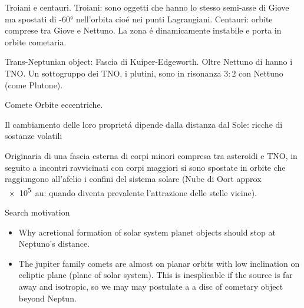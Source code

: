 \begin{frame}{Troiani e centauri.}
Troiani: sono oggetti che hanno lo stesso semi-asse di Giove ma spostati di \ang{+-60} nell'orbita cio\'e nei punti Lagrangiani.
Centauri: orbite comprese tra Giove e Nettuno. La zona \'e dinamicamente instabile e porta in orbite cometaria.
\end{frame}

\begin{frame}{Trans-Neptunian object: Fascia di Kuiper-Edgeworth.}
Oltre Nettuno di hanno i TNO.
Un sottogruppo dei TNO, i plutini, sono in risonanza $3:2$ con Nettuno (come Plutone).
\end{frame}

\begin{frame}{Comete}
Orbite eccentriche.

Il cambiamento delle loro propriet\'a dipende dalla distanza dal Sole: ricche di sostanze volatili

Originaria di una fascia esterna di corpi minori compresa tra asteroidi e TNO, in seguito a incontri ravvicinati con corpi maggiori si sono spostate in orbite che raggiungono all'afelio i confini del sistema solare (Nube di Oort approx \SI{e5}{\astronomicalunit}: quando diventa prevalente l'attrazione delle stelle vicine).
\end{frame}

\begin{frame}{Search motivation}
\begin{itemize}
\item Why acretional formation of solar system planet objects should stop at Neptuno's distance.
\item The jupiter family comets are almost on planar orbits with low inclination on ecliptic plane (plane of solar system). This is inesplicable if the source is far away and isotropic, so we may may postulate a a disc of cometary object beyond Neptun.
\end{itemize}
\end{frame}
